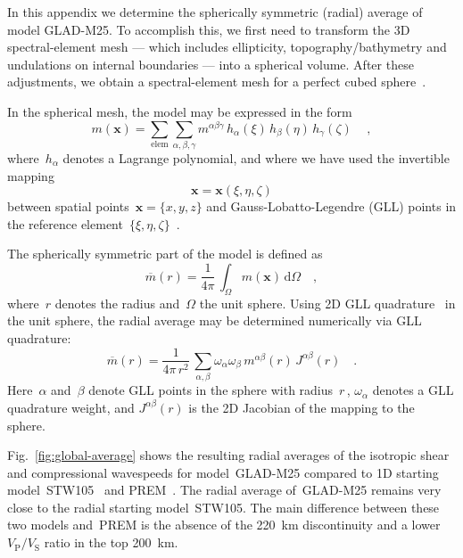 \documentclass[extra,mreferee]{gji}
\begin{document}
In this appendix we determine the spherically symmetric (radial) average of model GLAD-M25.
To accomplish this,
we first need to transform the 3D spectral-element mesh --- which includes ellipticity, topography/bathymetry and undulations on internal boundaries --- into a spherical volume.
After these adjustments, we obtain a spectral-element mesh for a perfect cubed sphere~\citep{KoTr02a}.

In the spherical mesh, the model may be expressed in the form
\begin{equation}
    m(\mathbf{x})=\sum_{\mathrm{elem}}\sum_{\alpha,\beta,\gamma}m^{\alpha\beta\gamma}\,h_{\alpha}(\xi)\,h_{\beta}(\eta)\,h_{\gamma}(\zeta)\,
    \quad ,
\end{equation}
where~$h_\alpha$ denotes a Lagrange polynomial, and where we have used the invertible mapping
\begin{equation}
    \mathbf{x}=\mathbf{x}(\xi,\eta,\zeta)
\end{equation}
between spatial points~$\mathbf{x}=\{x,y,z\}$ and Gauss-Lobatto-Legendre (GLL) points in the reference element~$\{\xi,\eta,\zeta\}$~\citep{KoTr99}.

The spherically symmetric part of the model is defined as
\begin{equation}
    \overline{m}(r)=\frac{1}{4\pi}\,\int_\Omega m(\mathbf{x})\,\mathrm{d} \Omega
    \quad,
\end{equation}
where~$r$ denotes the radius and~$\Omega$ the unit sphere.
Using 2D GLL quadrature~\citep{KoTr99} in the unit sphere,
the radial average may be determined numerically via GLL quadrature:
\begin{equation}
    \overline{m}(r)=\frac{1}{4\pi\,r^2}\,\sum_{\alpha,\beta}\omega_\alpha\omega_\beta\,m^{\alpha\beta}(r)\,J^{\alpha\beta}(r)
    \quad.
    \label{eq:radial_average}
\end{equation}
Here~$\alpha$ and~$\beta$ denote GLL points in the sphere with radius~$r$\,,
$\omega_\alpha$ denotes a GLL quadrature weight, and $J^{\alpha\beta}(r)$ is the 2D Jacobian of the mapping to the sphere.

Fig.~\ref{fig:global-average} shows the resulting radial averages of the isotropic shear and compressional wavespeeds for model~GLAD-M25
compared to 1D starting model~STW105~\citep{kustowski2008anisotropic} and PREM~\citep{PREM}.
The radial average of~GLAD-M25 remains very close to the radial starting model~STW105.
The main difference between these two models and~PREM
is the absence of the 220~km discontinuity and a lower~$V_\text{P}/V_\text{S}$ ratio in the top 200~km.
\end{document}
